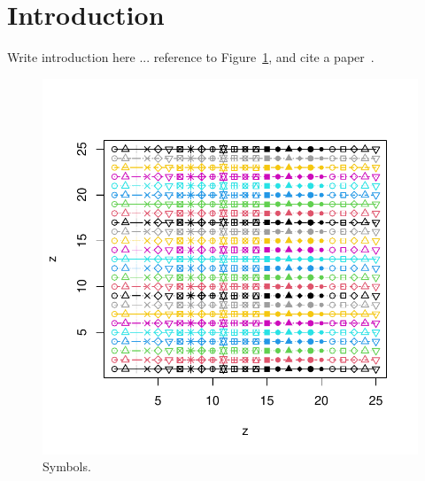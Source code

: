 \section{Introduction}
\label{sec:intro}

Write introduction here ... reference to Figure~\ref{fig:symbols}, and cite a paper~\cite{HCHFC21}.

\begin{figure}
\includegraphics[width=.99\columnwidth]{images/symbols.pdf}
\caption{Symbols.}
\label{fig:symbols}
\end{figure}

